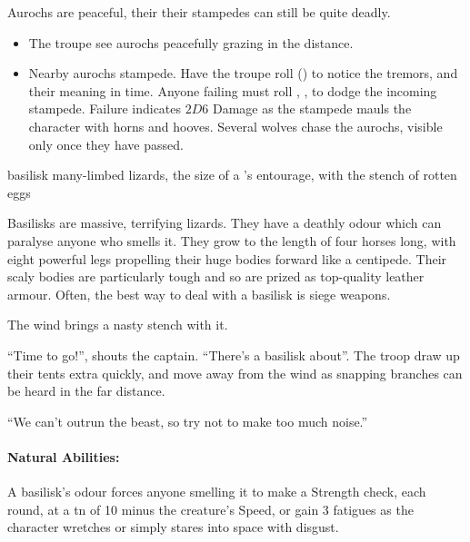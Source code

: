 \begin{multicols}{2}
\showEnc
Aurochs are peaceful, their their stampedes can still be quite deadly.

\begin{itemize}

  \item
  The troupe see aurochs peacefully grazing in the distance.
  \item
  Nearby aurochs stampede.
  Have the troupe roll  (\tn[8]) to notice the tremors, and their meaning in time.
  Anyone failing must roll , \tn[9], to dodge the incoming stampede.
  Failure indicates $2D6$ Damage as the stampede mauls the character with horns and hooves.
  Several wolves chase the aurochs, visible only once they have passed.

\end{itemize}

  {basilisk}%
  {many-limbed lizards, the size of a 's entourage, with the stench of rotten eggs}%

Basilisks are massive, terrifying lizards.
They have a deathly odour which can paralyse anyone who smells it.
They grow to the length of four horses long, with eight powerful legs propelling their huge bodies forward like a centipede.
Their scaly bodies are particularly tough and so are prized as top-quality leather armour.
Often, the best way to deal with a basilisk is siege weapons.

\begin{boxtext}

  The wind brings a nasty stench with it.

  ``Time to go!'', shouts the captain.
  ``There's a basilisk about''.
  The troop draw up their tents extra quickly, and move away from the wind as snapping branches can be heard in the far distance.

  ``We can't outrun the beast, so try not to make too much noise.''

\end{boxtext}

\basilisk

\paragraph{Natural Abilities:} A basilisk's odour forces anyone smelling it to make a Strength check, each round, at a \gls{tn} of 10 minus the creature's Speed, or gain 3 \glspl{fatigue} as the character wretches or simply stares into space with disgust.


\end{multicols}
